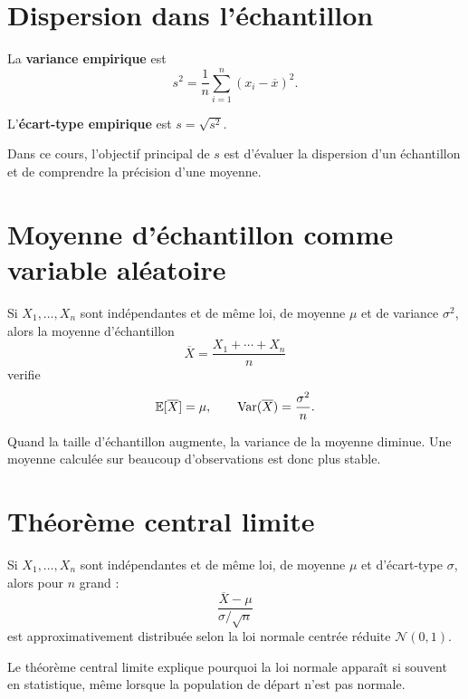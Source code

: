 \section{Dispersion dans l'échantillon}

\begin{Def}
La \textbf{variance empirique} est
$$
s^2=\frac{1}{n}\sum_{i=1}^n (x_i-\overline{x})^2.
$$
\end{Def}

\begin{Def}
L'\textbf{écart-type empirique} est $s=\sqrt{s^2}$.
\end{Def}

\begin{Rmq}
Dans ce cours, l'objectif principal de $s$ est d'évaluer la dispersion d'un échantillon et de comprendre la précision d'une moyenne.
\end{Rmq}

\section{Moyenne d'échantillon comme variable aléatoire}

\begin{Prop}
Si $X_1,\dots,X_n$ sont indépendantes et de même loi, de moyenne $\mu$ et de variance $\sigma^2$, alors la moyenne d'échantillon
$$
\overline{X}=\frac{X_1+\cdots+X_n}{n}
$$
verifie
$$
\mathbb{E}[\overline{X}]=\mu,
\qquad
\operatorname{Var}(\overline{X})=\frac{\sigma^2}{n}.
$$
\end{Prop}

\begin{Rmq}
Quand la taille d'échantillon augmente, la variance de la moyenne diminue. Une moyenne calculée sur beaucoup d'observations est donc plus stable.
\end{Rmq}

\section{Théorème central limite}

\begin{Prop}
Si $X_1,\dots,X_n$ sont indépendantes et de même loi, de moyenne $\mu$ et d'écart-type $\sigma$, alors pour $n$ grand :
$$
\frac{\overline{X}-\mu}{\sigma/\sqrt{n}}
$$
est approximativement distribuée selon la loi normale centrée réduite $\mathcal{N}(0,1)$.
\end{Prop}

\begin{Rmq}
Le théorème central limite explique pourquoi la loi normale apparaît si souvent en statistique, même lorsque la population de départ n'est pas normale.
\end{Rmq}

